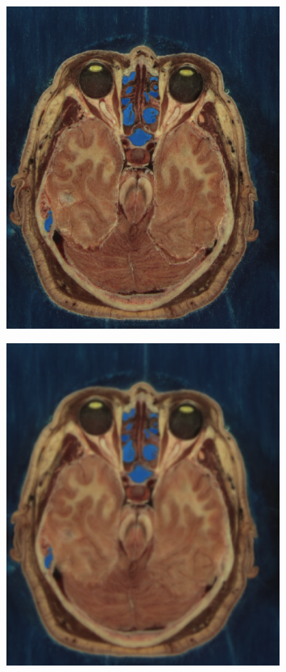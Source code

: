 \documentclass{InsightArticle}
\begin{document}
\begin{figure}
\center
\includegraphics[width=0.8\textwidth]{VisibleWomanHeadFull_Slice.eps}
\label{fig:Input Image}
\end{figure}

\begin{figure}
\center
\includegraphics[width=0.8\textwidth]{VisibleWomanHeadFull_Smooth_Slice.eps}
\label{fig:Output Image}
\end{figure}
\end{document}
